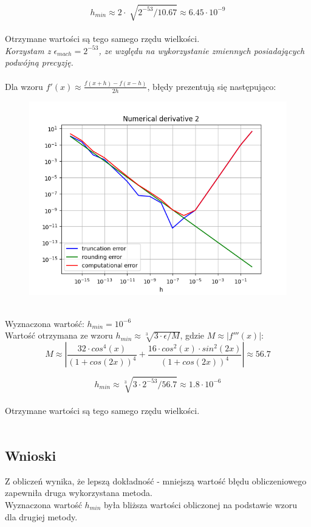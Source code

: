 \documentclass{article}
\begin{document}
$$h_{min} \approx 2\cdot\sqrt[]{2^{-53}/10.67}
\approx 6.45 \cdot 10^{-9}$$
\\
Otrzymane wartości są tego samego rzędu wielkości. \\
\textit{Korzystam z $\epsilon_{mach}=2^{-53}$,
 ze względu na wykorzystanie zmiennych posiadających podwójną precyzję.}
\\\\
Dla wzoru $f'(x)\approx\frac{f(x+h)-f(x-h)}{2h}$, błędy prezentują się następująco:
\begin{figure}[ht!]
\includegraphics[width=\linewidth]{figures/numerical_derivative_2.png}
\end{figure}
\\
Wyznaczona wartość: $h_{min} = 10^{-6}$ \\
Wartość otrzymana ze wzoru $h_{min} \approx \sqrt[3]{3\cdot\epsilon/M}$,
gdzie $M \approx \left|f'''(x)\right|$: \\
$$M\approx \left|\frac{32\cdot cos^4(x)}{(1 + cos(2 x))^4} + \frac{16\cdot cos^2(x)\cdot sin^2(2 x)}{(1 + cos(2 x))^4}\right|
\approx 56.7$$

$$h_{min} \approx \sqrt[3]{3\cdot2^{-53}/56.7}
\approx 1.8 \cdot 10^{-6}$$
\\
Otrzymane wartości są tego samego rzędu wielkości.  \\
\\
\subsection*{Wnioski}
Z obliczeń wynika, że lepszą dokładność - mniejszą
wartość błędu obliczeniowego zapewniła druga 
wykorzystana metoda. \\
Wyznaczona wartość $h_{min}$ była bliższa wartości
obliczonej na podstawie wzoru dla drugiej metody.
\\
\end{document}

